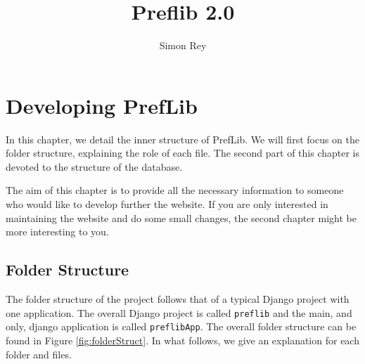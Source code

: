 \documentclass{report}
\begin{document}
	\title{Preflib 2.0}
	\author{Simon Rey}
	\maketitle
	
	\tableofcontents
	
	\chapter{Developing PrefLib}
	
	In this chapter, we detail the inner structure of PrefLib. We will first focus on the folder structure, explaining the role of each file. The second part of this chapter is devoted to the structure of the database. 
	
	The aim of this chapter is to provide all the necessary information to someone who would like to develop further the website. If you are only interested in maintaining the website and do some small changes, the second chapter might be more interesting to you.
	
	\section{Folder Structure}
	
	The folder structure of the project follows that of a typical Django project with one application. The overall Django project is called \texttt{preflib} and the main, and only, django application is called \texttt{preflibApp}. The overall folder structure can be found in Figure \ref{fig:folderStruct}. In what follows, we give an explanation for each folder and files.
	
\end{document}
